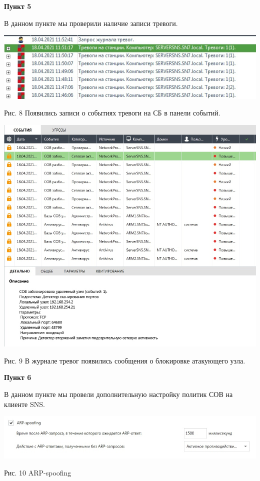 \documentclass[a4paper,14pt]{extarticle}
\begin{document}
    \textbf{Пункт 5}
    \vspace{-3ex}
    \begin{center}
        \singlespacing
        В данном пункте мы проверили наличие записи тревоги. 

        \includegraphics[scale=0.6]{pics/5_1.jpg}

        Рис. 8 Появились записи о событиях тревоги на СБ в панели событий.

        \includegraphics[scale=0.45]{pics/5_2.jpg}

        Рис. 9 В журнале тревог появились сообщения о блокировке атакующего узла.

    \end{center}

    \newpage
    \textbf{Пункт 6}
    \vspace{-3ex}
    \begin{center}
        \singlespacing
        В данном пункте мы провели дополнительную настройку политик СОВ на клиенте SNS.

        \includegraphics[scale=0.6]{pics/6.jpg}

        Рис. 10 ARP-spoofing
    \end{center}
\end{document}
